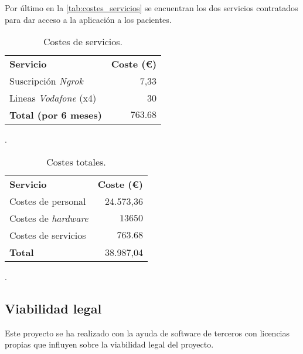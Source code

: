 Por último en la \autoref{tab:costes_servicios} se encuentran los dos servicios contratados para dar acceso a la aplicación a los pacientes.

\begin{table}
	\centering
	\begin{tabular}[]{@{}l r@{}}
		\toprule
		\textbf{Servicio} & \textbf{Coste (\euro{})}\\
		\otoprule
 		Suscripción \textit{Ngrok}  & 7,33 \\
		Lineas \textit{Vodafone} (x4) & 30 \\\hubu
		\textbf{Total (por 6 meses)} & $763.68$\\
		\bottomrule
	\end{tabular}
	\caption{Costes de servicios.}
	\label{tab:costes_servicios}.
\end{table}

\begin{table}
	\centering
	\begin{tabular}[]{@{}l r@{}}
		\toprule
		\textbf{Servicio} & \textbf{Coste (\euro{})}\\
		\otoprule
		Costes de personal  & 24.573,36 \\
		Costes de \textit{hardware} & $13650$ \\
		Costes de servicios & $763.68$ \\\hubu
		\textbf{Total} & 38.987,04\\
		\bottomrule
	\end{tabular}
	\caption{Costes totales.}
	\label{tab:costes_totales}.
\end{table}


\subsection{Viabilidad legal}

Este proyecto se ha realizado con la ayuda de software de terceros con licencias propias que influyen sobre la viabilidad legal del proyecto.


